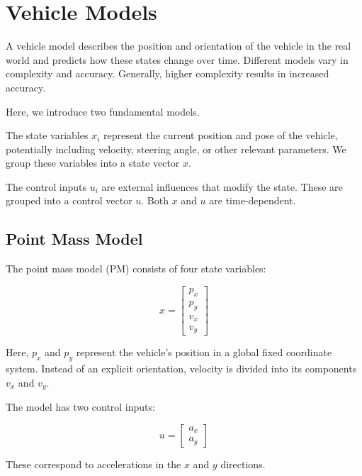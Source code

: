 \section{Vehicle Models} \label{sec:vehicle_models}

A vehicle model describes the position and orientation of the vehicle in the real world and predicts how these states change over time.
Different models vary in complexity and accuracy.
Generally, higher complexity results in increased accuracy.

Here, we introduce two fundamental models.

The state variables $x_i$ represent the current position and pose of the vehicle, potentially including velocity, steering angle, or other relevant
parameters.
We group these variables into a state vector $x$.

The control inputs $u_i$ are external influences that modify the state.
These are grouped into a control vector $u$.
Both $x$ and $u$ are time-dependent.

\subsection{Point Mass Model} \label{subsec:point_mass_model}

The point mass model (PM) consists of four state variables:

\begin{equation}
	x = \begin{bmatrix} p_x \\ p_y \\ v_x \\ v_y \end{bmatrix}
	\label{eq:states_pm}
\end{equation}

Here, $p_x$ and $p_y$ represent the vehicle's position in a global fixed coordinate system.
Instead of an explicit orientation, velocity is divided into its components $v_x$ and $v_y$.

The model has two control inputs:

\begin{equation}
	u = \begin{bmatrix} a_x \\ a_y \end{bmatrix}
	\label{eq:controls_pm}
\end{equation}

These correspond to accelerations in the $x$ and $y$ directions.

